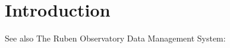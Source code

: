 \section{Introduction}

 See also The Ruben Observatory  Data Management System: \cite{2015arXiv151207914J}



